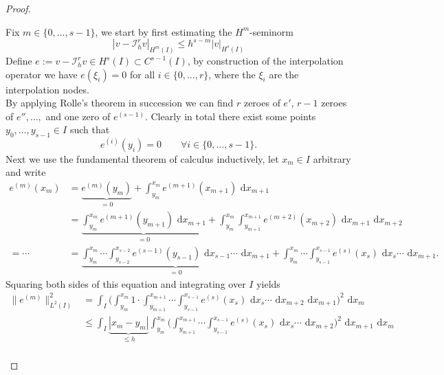 \begin{proof}
	\begin{proofstep}
		Fix $m \in \{0,\ldots,s-1\}$, we start by first estimating the $H^m$-seminorm
		\begin{equation}
			\label{eq:proof_polynomial_interpolation_approx_estimate_seminorm}
			| v - \mathcal{I}_h^r v |_{H^m(I)} \leq h^{s-m} |v|_{H^s(I)}
		\end{equation} 
		Define $e := v - \mathcal{I}_h^r v \in H^s(I) \subset C^{s-1}(I)$, by construction of the interpolation operator we have $e(\xi_i) = 0$ for 
		all $i \in \{0,\ldots,r\}$, where the $\xi_i$ are the interpolation nodes. \\
		By applying Rolle's theorem in succession we can find $r$ zeroes of $e'$, $r-1$ zeroes of $e''$$,\ldots,$ and one zero of $e^{(s-1)}$.
		Clearly in total there exist some points $y_0,\ldots,y_{s-1} \in I$ such that 
		\begin{equation*}
			e^{(i)}(y_i) = 0 \qquad \forall i \in \{0,\ldots,s-1\}.
		\end{equation*} 
		Next we use the fundamental theorem of calculus inductively, let $x_m \in I$ arbitrary and write
		\begin{align*}
			e^{(m)}(x_m) &= \underbrace{e^{(m)}(y_m)}_{=0} + \int_{y_m}^{x_m} e^{(m+1)}(x_{m+1}) \text{ d}x_{m+1} \\
			&= \underbrace{\int_{y_m}^{x_m} e^{(m+1)}(y_{m+1}) \text{ d}x_{m+1}}_{=0} 
			+\int_{y_m}^{x_m} \int_{y_{m+1}}^{x_{m+1}} e^{(m+2)}(x_{m+2}) \text{ d}x_{m+1} \text{ d}x_{m+2} \\
			= \cdots &= \underbrace{\int_{y_m}^{x_m}\cdots \int_{y_{s-2}}^{x_{s-2}} e^{(s-1)}(y_{s-1}) \text{ d}x_{s-1} \cdots \text{ d}x_{m+1}}_{=0}
			+ \int_{y_m}^{x_m}\cdots \int_{y_{s-1}}^{x_{s-1}} e^{(s)}(x_{s}) \text{ d}x_{s} \cdots \text{ d}x_{m+1}.
		\end{align*}
		Squaring both sides of this equation and integrating over $I$ yields
		\begin{align*}
			\| e^{(m)} \|_{L^2(I)}^2 &= 
			\int_{I} \Big(\int_{y_m}^{x_m}1 \cdot \int_{y_{m+1}}^{x_{m+1}}\cdots \int_{y_{s-1}}^{x_{s-1}} e^{(s)}(x_{s}) 
			\text{ d}x_{s} \cdots \text{ d}x_{m+2} \text{ d}x_{m+1}\Big)^2 \text{ d}x_{m} \\
			& \leq \int_{I} \underbrace{|x_{m} - y_{m} |}_{\leq h} \int_{y_m}^{x_m} \Big(\int_{y_{m+1}}^{x_{m+1}}\cdots \int_{y_{s-1}}^{x_{s-1}} e^{(s)}(x_{s}) 
			\text{ d}x_{s} \cdots \text{ d}x_{m+2} \Big)^2 \text{ d}x_{m+1} \text{ d}x_{m} \\

\end{align*}$$
\end{proofstep}
\end{proof}
